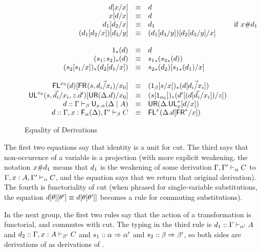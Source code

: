 \begin{figure}
\[
\begin{array}{rcll} 
d[{x}/x] & \equiv & d \\
{x}[d/x] & \equiv & d \\
d_1[d_2/x] & \equiv & d_1 & \text{if $x \# d_1$}\\
(d_1[d_2/x])[d_3/y] & \equiv & (d_1[d_3/y])[d_2[d_3/y]/x]\\
\\
1_*(d) & \equiv & d\\
(s_1;s_2)_*(d) & \equiv & {s_1}_*({s_2}_*(d)) \\
(s_2[s_1/x])_*(d_2[d_1/x]) & \equiv & {s_2}_*(d_2)[{s_1}_*(d_1)/x] \\
\\
\mathsf{FL}^{x_0}(d)[\mathsf{FR}_{}(s,\vec{d_i/x_i})/x_0] & \equiv & (1_\beta[s/x])_*(d[\vec{d_i/x_i}]) \\
\mathsf{UL}^{x_0}_{}(s,\vec{d_i}/x_i,z.d')[\mathsf{UR}(\Delta.d)/x_0] & \equiv & (s[1_{\alpha_0}])_*(d'[(d[{\vec{d_i}/x_i}])/z]) \\
d :: \Gamma \vdash_{\beta} \mathsf{U}_{x.\alpha}(\Delta \mid A) & \equiv & \mathsf{UR}(\Delta.\mathsf{UL}^*_{x}[d/x])\\
d :: \Gamma,x:\mathsf{F}_{\alpha}(\Delta),\Gamma' \vdash_{\beta} C & \equiv & \mathsf{FL}^{x}(\Delta.d[\mathsf{FR}^*/x])\\
\end{array}
\]
\caption{Equality of Derivations}
\label{fig:equality-of-derivations}
\end{figure}

The first two equations say that identity is a unit for cut.  The third
says that non-occurence of a variable is a projection (with more
explicit weakening, the notation $x \# d_1$ means that $d_1$ is the
weakening of some derivation $\Gamma,\Gamma' \vdash_{\alpha} C$ to
$\Gamma,x:A,\Gamma' \vdash_{\alpha} C$, and the equation says that we
return that original derivation).  The fourth is functoriality of cut
(when phrased for single-variable substitutions, the equation
$d[\theta][\theta'] \equiv d[\theta[\theta']]$ becomes a rule for
commuting substitutions).

In the next group, the first two rules say that the action of a
transformation is functorial, and commutes with cut.  The typing in the
third rule is $d_1 :: \Gamma \vdash_{\alpha'} A$ and $d_2 ::
\Gamma,x:A \vdash_{\beta'} C$ and $s_1 :: \alpha \Rightarrow \alpha'$ and $s_2
:: \beta \Rightarrow \beta'$, so both sides are derivations of as derivations
of .

